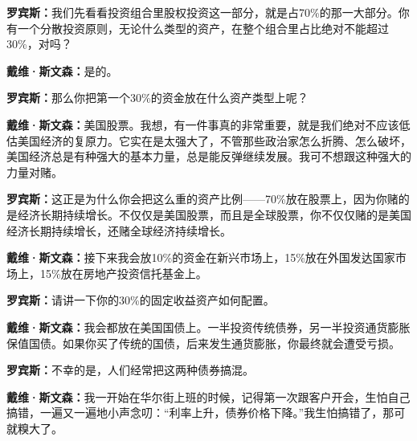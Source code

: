 \begin{BookQuote}
\textbf{罗宾斯：}我们先看看投资组合里股权投资这一部分，就是占70\%的那一大部分。你有一个分散投资原则，无论什么类型的资产，在整个组合里占比绝对不能超过30\%，对吗？
\end{BookQuote}

\begin{BookQuote}
\textbf{戴维·斯文森：}是的。
\end{BookQuote}

\begin{BookQuote}
\textbf{罗宾斯：}那么你把第一个30\%的资金放在什么资产类型上呢？
\end{BookQuote}

\begin{BookQuote}
\textbf{戴维·斯文森：}美国股票。我想，有一件事真的非常重要，就是我们绝对不应该低估美国经济的复原力。它实在是太强大了，不管那些政治家怎么折腾、怎么破坏，美国经济总是有种强大的基本力量，总是能反弹继续发展。我可不想跟这种强大的力量对赌。
\end{BookQuote}

\begin{BookQuote}
\textbf{罗宾斯：}这正是为什么你会把这么重的资产比例——70\%放在股票上，因为你赌的是经济长期持续增长。不仅仅是美国股票，而且是全球股票，你不仅仅赌的是美国经济长期持续增长，还赌全球经济持续增长。
\end{BookQuote}

\begin{BookQuote}
\textbf{戴维·斯文森：}接下来我会放10\%的资金在新兴市场上，15\%放在外国发达国家市场上，15\%放在房地产投资信托基金上。
\end{BookQuote}

\begin{BookQuote}
\textbf{罗宾斯：}请讲一下你的30\%的固定收益资产如何配置。
\end{BookQuote}

\begin{BookQuote}
\textbf{戴维·斯文森：}我会都放在美国国债上。一半投资传统债券，另一半投资通货膨胀保值国债。如果你买了传统的国债，后来发生通货膨胀，你最终就会遭受亏损。
\end{BookQuote}

\begin{BookQuote}
\textbf{罗宾斯：}不幸的是，人们经常把这两种债券搞混。
\end{BookQuote}

\begin{BookQuote}
\textbf{戴维·斯文森：}我一开始在华尔街上班的时候，记得第一次跟客户开会，生怕自己搞错，一遍又一遍地小声念叨：“利率上升，债券价格下降。”我生怕搞错了，那可就糗大了。
\end{BookQuote}

